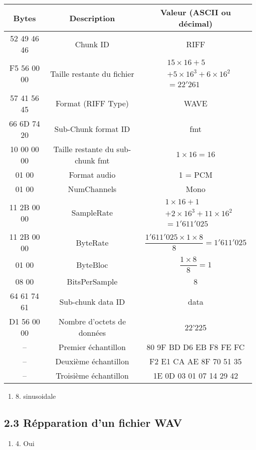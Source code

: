 \documentclass[a4paper, 12pt]{article}
\begin{document}
\begin{tabular}{|c|c|c|}
  \hline
  Bytes & Description & Valeur (ASCII ou décimal) \\
  \hline
  52 49 46 46 & Chunk ID & RIFF \\
  \hline
  F5 56 00 00 & Taille restante du fichier & $\begin{aligned} & 15 \times 16 + 5 \\ & + 5 \times 16^{3} + 6 \times 16^{2} \\ &= 22'261 \end{aligned}$ \\
  \hline
  57 41 56 45 & Format (RIFF Type) & WAVE \\
  \hline
  66 6D 74 20 & Sub-Chunk format ID & fmt \\
  \hline
  10 00 00 00 & Taille restante du sub-chunk fmt & $1 \times 16 = 16$ \\
  \hline
  01 00 & Format audio & 1 = PCM \\
  \hline
  01 00 & NumChannels & Mono \\
  \hline
  11 2B 00 00 & SampleRate & $\begin{aligned} & 1 \times 16 + 1 \\ & + 2 \times 16^{3} + 11 \times 16^{2} \\ &= 1'611'025 \end{aligned}$ \\
  \hline
  11 2B 00 00 & ByteRate & $\dfrac{1'611'025 \times 1 \times 8}{8} = 1'611'025$ \\
  \hline
  01 00 & ByteBloc & $\dfrac{1 \times 8}{8} = 1$ \\
  \hline
  08 00 & BitsPerSample & 8 \\
  \hline
  64 61 74 61 & Sub-chunk data ID & data \\
  \hline
  D1 56 00 00 & Nombre d'octets de données & 22'225 \\
  \hline
  -- & Premier échantillon & 80 9F BD D6 EB F8 FE FC \\
  \hline
  -- & Deuxième échantillon & F2 E1 CA AE 8F 70 51 35 \\
  \hline
  -- & Troisième échantillon & 1E 0D 03 01 07 14 29 42 \\
  \hline
\end{tabular}

\begin{enumerate}
  \item[] 8. sinusoidale
\end{enumerate}

\subsection*{2.3 Répparation d'un fichier WAV}
\begin{enumerate}
  \item[] 4. Oui

\end{enumerate}
\end{document}
